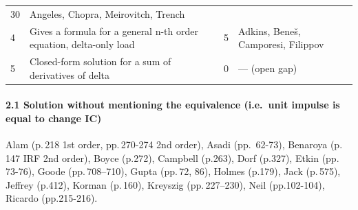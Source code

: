 \documentclass[
  11pt,
]{article}
\begin{document}
\begin{longtable}[]{@{}llll@{}}
\begin{minipage}[t]{0.22\columnwidth}
30\strut
\end{minipage} & \begin{minipage}[t]{0.22\columnwidth}\raggedright
Angeles, Chopra, Meirovitch, Trench\strut
\end{minipage}\tabularnewline
\begin{minipage}[t]{0.22\columnwidth}\raggedright
4\strut
\end{minipage} & \begin{minipage}[t]{0.22\columnwidth}\raggedright
Gives a formula for a general n-th order equation, delta-only load\strut
\end{minipage} & \begin{minipage}[t]{0.22\columnwidth}\raggedright
5\strut
\end{minipage} & \begin{minipage}[t]{0.22\columnwidth}\raggedright
Adkins, Beneš, Camporesi, Filippov\strut
\end{minipage}\tabularnewline
\begin{minipage}[t]{0.22\columnwidth}\raggedright
5\strut
\end{minipage} & \begin{minipage}[t]{0.22\columnwidth}\raggedright
Closed-form solution for a sum of derivatives of delta\strut
\end{minipage} & \begin{minipage}[t]{0.22\columnwidth}\raggedright
0\strut
\end{minipage} & \begin{minipage}[t]{0.22\columnwidth}\raggedright
--- (open gap)\strut
\end{minipage}\tabularnewline
\bottomrule
\end{longtable}

\hypertarget{solution-without-mentioning-the-equivalence-i.e.-unit-impulse-is-equal-to-change-ic}{%
\paragraph{2.1 Solution without mentioning the equivalence (i.e.~unit
impulse is equal to change
IC)}\label{solution-without-mentioning-the-equivalence-i.e.-unit-impulse-is-equal-to-change-ic}}

Alam (p.\,218 1st order, pp.\,270-274 2nd order), Asadi (pp.~62-73),
Benaroya (p.\,147 IRF 2nd order), Boyce (p.272), Campbell (p.263), Dorf
(p.327), Etkin (pp.\,73-76), Goode (pp.\,708--710), Gupta (pp.\,72, 86),
Holmes (p.179), Jack (p.\,575), Jeffrey (p.412), Korman (p.\,160),
Kreyszig (pp.\,227--230), Neil (pp.102-104), Ricardo (pp.215-216).
\end{document}
